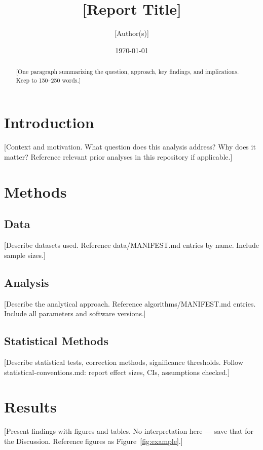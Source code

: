 \documentclass[11pt,a4paper]{article}
\title{[Report Title]}
\author{[Author(s)]}
\date{\today}
\begin{document}
\maketitle

\begin{abstract}
[One paragraph summarizing the question, approach, key findings, and implications.
Keep to 150--250 words.]
\end{abstract}

\section{Introduction}

[Context and motivation. What question does this analysis address? Why does it matter?
Reference relevant prior analyses in this repository if applicable.]

\section{Methods}

\subsection{Data}
[Describe datasets used. Reference data/MANIFEST.md entries by name.
Include sample sizes.]

\subsection{Analysis}
[Describe the analytical approach. Reference algorithms/MANIFEST.md entries.
Include all parameters and software versions.]

\subsection{Statistical Methods}
[Describe statistical tests, correction methods, significance thresholds.
Follow statistical-conventions.md: report effect sizes, CIs, assumptions checked.]

\section{Results}

[Present findings with figures and tables. No interpretation here — save that
for the Discussion. Reference figures as Figure~\ref{fig:example}.]
\end{document}
